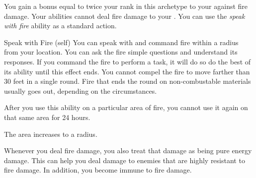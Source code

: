              You gain a bonus equal to twice your rank in this archetype to your  against fire damage.
             Your abilities cannot deal fire damage to your .
             You can use the \textit{speak with fire} ability as a standard action.
            \begin{attuneability}{Speak with Fire}
                 (self)
                \rankline
                You can speak with and command fire within a \areahuge radius  from your location.
                You can ask the fire simple questions and understand its responses.
                If you command the fire to perform a task, it will do so do the best of its ability until this effect ends.
                You cannot compel the fire to move farther than 30 feet in a single round.
                Fire that ends the round on non-combustable materials usually goes out, depending on the circumstances.

                After you use this ability on a particular area of fire, you cannot use it again on that same area for 24 hours.

                \rankline
                 The area increases to a \areagarg radius.
            \end{attuneability}
             Whenever you deal fire damage, you also treat that damage as being pure energy damage.
            This can help you deal damage to enemies that are highly resistant to fire damage.
            In addition, you become immune to fire damage.

